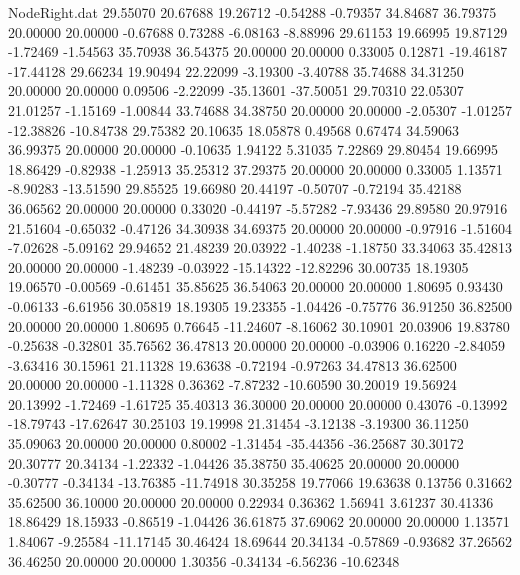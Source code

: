\begin{filecontents}{NodeRight.dat}
  29.55070   20.67688   19.26712    -0.54288   -0.79357   34.84687   36.79375   20.00000   20.00000   -0.67688    0.73288   -6.08163   -8.88996
  29.61153   19.66995   19.87129    -1.72469   -1.54563   35.70938   36.54375   20.00000   20.00000    0.33005    0.12871  -19.46187  -17.44128
  29.66234   19.90494   22.22099    -3.19300   -3.40788   35.74688   34.31250   20.00000   20.00000    0.09506   -2.22099  -35.13601  -37.50051
  29.70310   22.05307   21.01257    -1.15169   -1.00844   33.74688   34.38750   20.00000   20.00000   -2.05307   -1.01257  -12.38826  -10.84738
  29.75382   20.10635   18.05878     0.49568    0.67474   34.59063   36.99375   20.00000   20.00000   -0.10635    1.94122    5.31035    7.22869
  29.80454   19.66995   18.86429    -0.82938   -1.25913   35.25312   37.29375   20.00000   20.00000    0.33005    1.13571   -8.90283  -13.51590
  29.85525   19.66980   20.44197    -0.50707   -0.72194   35.42188   36.06562   20.00000   20.00000    0.33020   -0.44197   -5.57282   -7.93436
  29.89580   20.97916   21.51604    -0.65032   -0.47126   34.30938   34.69375   20.00000   20.00000   -0.97916   -1.51604   -7.02628   -5.09162
  29.94652   21.48239   20.03922    -1.40238   -1.18750   33.34063   35.42813   20.00000   20.00000   -1.48239   -0.03922  -15.14322  -12.82296
  30.00735   18.19305   19.06570    -0.00569   -0.61451   35.85625   36.54063   20.00000   20.00000    1.80695    0.93430   -0.06133   -6.61956
  30.05819   18.19305   19.23355    -1.04426   -0.75776   36.91250   36.82500   20.00000   20.00000    1.80695    0.76645  -11.24607   -8.16062
  30.10901   20.03906   19.83780    -0.25638   -0.32801   35.76562   36.47813   20.00000   20.00000   -0.03906    0.16220   -2.84059   -3.63416
  30.15961   21.11328   19.63638    -0.72194   -0.97263   34.47813   36.62500   20.00000   20.00000   -1.11328    0.36362   -7.87232  -10.60590
  30.20019   19.56924   20.13992    -1.72469   -1.61725   35.40313   36.30000   20.00000   20.00000    0.43076   -0.13992  -18.79743  -17.62647
  30.25103   19.19998   21.31454    -3.12138   -3.19300   36.11250   35.09063   20.00000   20.00000    0.80002   -1.31454  -35.44356  -36.25687
  30.30172   20.30777   20.34134    -1.22332   -1.04426   35.38750   35.40625   20.00000   20.00000   -0.30777   -0.34134  -13.76385  -11.74918
  30.35258   19.77066   19.63638     0.13756    0.31662   35.62500   36.10000   20.00000   20.00000    0.22934    0.36362    1.56941    3.61237
  30.41336   18.86429   18.15933    -0.86519   -1.04426   36.61875   37.69062   20.00000   20.00000    1.13571    1.84067   -9.25584  -11.17145
  30.46424   18.69644   20.34134    -0.57869   -0.93682   37.26562   36.46250   20.00000   20.00000    1.30356   -0.34134   -6.56236  -10.62348

\end{filecontents}
